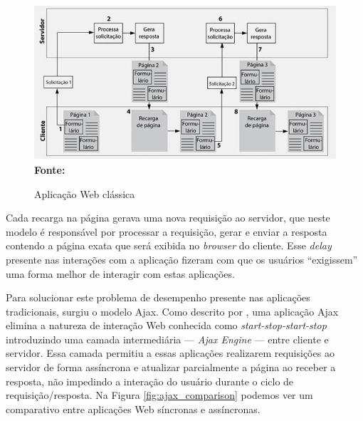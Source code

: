 \begin{figure}[!ht]
	\centering	
	\caption[\hspace{0.1cm}Aplicação Web clássica.]{Aplicação Web clássica}
	  \vspace{-0.4cm}
	\includegraphics[width=.8\textwidth]{figuras/arquitetura_web_tradicional.png}
	 \vspace{-0.3cm}
	\\\textbf{\footnotesize Fonte: \cite{deitelAjax}}
	\label{fig:arquitetura_web_tradicional}
\end{figure}

Cada recarga na página gerava uma nova requisição ao servidor, que neste modelo é responsável por processar a requisição, gerar e enviar a resposta 
contendo a página exata que será exibida no \textit{browser} do cliente. Esse \textit{delay} presente nas interações com a aplicação fizeram com que 
os usuários ``exigissem'' uma forma melhor de interagir com estas aplicações. 

Para solucionar este problema de desempenho presente nas aplicações tradicionais, surgiu o modelo Ajax. Como descrito por \cite{garrettAjax}, uma 
aplicação Ajax elimina a natureza de interação Web conhecida como \textit{start-stop-start-stop} introduzindo uma camada intermediária 
— \textit{Ajax Engine} — entre cliente e servidor. Essa camada permitiu a essas aplicações realizarem requisições ao servidor de forma assíncrona 
e atualizar parcialmente a página ao receber a resposta, não impedindo a interação do usuário durante o ciclo de requisição/resposta. Na 
Figura \ref{fig:ajax_comparison} podemos ver um comparativo entre aplicações Web síncronas e assíncronas.

